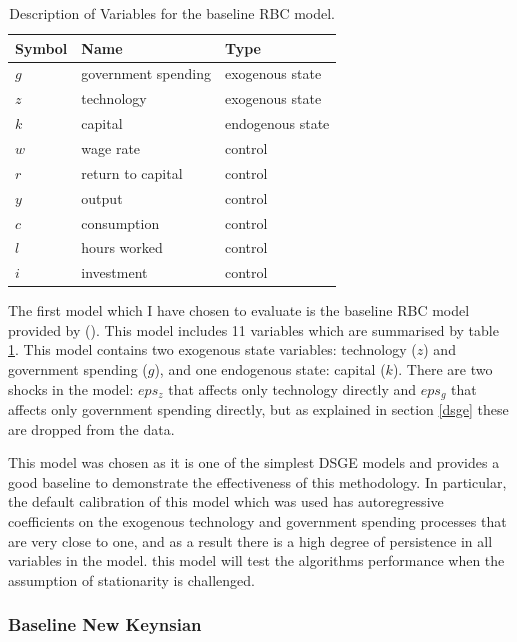 \documentclass{article}
\begin{document}
\begin{table}
  \centering
  \begin{tabular}{|l|l|l|}
    \hline
    Symbol & Name & Type \\
    \hline
    $g$ & government spending & exogenous state \\
    $z$ & technology & exogenous state \\
    $k$ & capital & endogenous state \\
    $w$ & wage rate & control \\
    $r$ & return to capital & control \\
    $y$ & output & control \\
    $c$ & consumption & control \\
    $l$ & hours worked & control \\
    $i$ & investment & control \\ \cline{2-2}
    \hline
  \end{tabular}
  \caption{Description of Variables for the baseline RBC model.}
  \label{rbc_data}
\end{table}

The first model which I have chosen to evaluate is the baseline RBC model provided by \citeauthor{pfeifer2020} (\citeyear{pfeifer2020}). This model includes 11 variables which are summarised by table \ref{rbc_data}. This model contains two exogenous state variables: technology ($z$) and government spending ($g$), and one endogenous state: capital ($k$). There are two shocks in the model: $eps_z$ that affects only technology directly and $eps_g$ that affects only government spending directly, but as explained in section \ref{dsge} these are dropped from the data.

This model was chosen as it is one of the simplest DSGE models and provides a good baseline to demonstrate the effectiveness of this methodology. In particular, the default calibration of this model which was used has autoregressive coefficients on the exogenous technology and government spending processes that are very close to one, and as a result there is a high degree of persistence in all variables in the model. this model will test the algorithms performance when the assumption of stationarity is challenged.

\subsubsection{Baseline New Keynsian}
\end{document}
